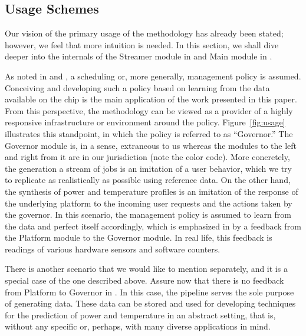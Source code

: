 \subsection{Usage Schemes} 
 Our vision of the primary usage of the
methodology has already been stated; however, we feel that more intuition is
needed. In this section, we shall dive deeper into the internals of the Streamer
module in  and Main module in .

As noted in  and , a scheduling or, more
generally, management policy is assumed. Conceiving and developing such a policy
based on learning from the data available on the chip is the main application of
the work presented in this paper. From this perspective, the methodology can be
viewed as a provider of a highly responsive infrastructure or environment around
the policy. Figure~\ref{fig:usage} illustrates this standpoint, in which the
policy is referred to as ``Governor.'' The Governor module is, in a sense,
extraneous to us whereas the modules to the left and right from it are in our
jurisdiction (note the color code). More concretely, the generation a stream of
jobs is an imitation of a user behavior, which we try to replicate as
realistically as possible using reference data. On the other hand, the synthesis
of power and temperature profiles is an imitation of the response of the
underlying platform to the incoming user requests and the actions taken by the
governor. In this scenario, the management policy is assumed to learn from the
data and perfect itself accordingly, which is emphasized in  by a
feedback from the Platform module to the Governor module. In real life, this
feedback is readings of various hardware sensors and software counters.

There is another scenario that we would like to mention separately, and it is a
special case of the one described above. Assure now that there is no feedback
from Platform to Governor in . In this case, the pipeline serves the
sole purpose of generating data. These data can be stored and used for
developing techniques for the prediction of power and temperature in an abstract
setting, that is, without any specific or, perhaps, with many diverse
applications in mind.
